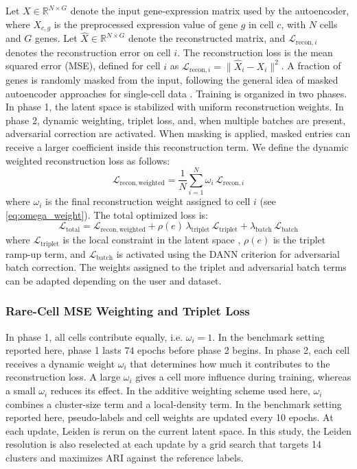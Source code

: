 \documentclass[11pt,a4paper]{article}
\begin{document}
Let $X \in \mathbb{R}^{N \times G}$ denote the
input gene-expression matrix used by the autoencoder, where $X_{c,g}$
is the preprocessed expression value of gene $g$ in cell $c$, with $N$
cells and $G$ genes. Let $\hat{X} \in \mathbb{R}^{N \times G}$ denote
the reconstructed matrix, and
$\mathcal{L}_{\mathrm{recon},i}$ denotes the reconstruction
error on cell $i$. The reconstruction loss is the mean squared error (MSE), defined for cell $i$ as
$\mathcal{L}_{\mathrm{recon},i} = \lVert \hat{X}_i - X_i \rVert^2$.
A fraction of genes is randomly masked from the input, following the general idea of masked autoencoder approaches for single-cell data \cite{fang2024,richter2025}. Training is organized in two phases. In phase 1, the latent space is stabilized with uniform reconstruction weights. In phase 2, dynamic weighting, triplet loss, and, when multiple batches are present, adversarial correction are activated. When masking is applied, masked entries can receive a larger coefficient inside this reconstruction term. We define the dynamic weighted reconstruction loss as follows:
\begin{equation}
  \mathcal{L}_{\mathrm{recon,weighted}}
  =
  \frac{1}{N}\sum_{i=1}^{N} \omega_i\,\mathcal{L}_{\mathrm{recon},i}
\end{equation}
where $\omega_i$ is the final reconstruction weight assigned to cell
$i$ (see \autoref{eq:omega_weight}).
The total optimized loss is:
\begin{equation}
  \mathcal{L}_{\mathrm{total}}
  =
  \mathcal{L}_{\mathrm{recon,weighted}}
  +
  \rho(e)\,\lambda_{\mathrm{triplet}}\,\mathcal{L}_{\mathrm{triplet}}
  +
  \lambda_{\mathrm{batch}}\,\mathcal{L}_{\mathrm{batch}}
\end{equation}
where $\mathcal{L}_{\mathrm{triplet}}$ is the local constraint in the
latent space \cite{schroff2015,yang2016}, $\rho(e)$ is the triplet ramp-up term, and
$\mathcal{L}_{\mathrm{batch}}$ is activated using the DANN criterion
\cite{ganin2016} for adversarial batch correction.
The weights assigned to the triplet and adversarial batch terms can be
adapted depending on the user and dataset. 



\subsubsection*{Rare-Cell MSE Weighting and Triplet Loss}

In phase 1, all cells contribute equally, i.e. $\omega_i = 1$. In the
benchmark setting reported here, phase 1 lasts $74$ epochs before
phase 2 begins. In phase 2, each cell receives a dynamic weight $\omega_i$ that determines
how much it contributes to the reconstruction loss. A large $\omega_i$
gives a cell more influence during training, whereas a small
$\omega_i$ reduces its effect. In the additive weighting scheme used here,
$\omega_i$ combines a cluster-size term and a local-density term.
In the benchmark setting reported here, pseudo-labels and cell weights
are updated every 10 epochs. At each update, Leiden is rerun on the
current latent space. In this study, the Leiden resolution is also
reselected at each update by a grid search that targets 14 clusters and
maximizes ARI against the reference labels.
\end{document}
